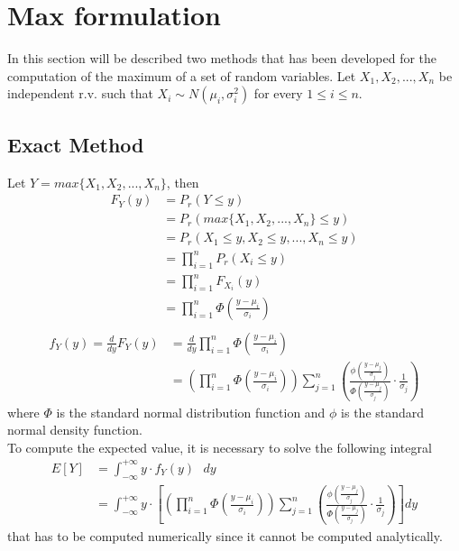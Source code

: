 \section{Max formulation}\label{max_formulation}

In this section will be described two methods that has been developed for the computation of the maximum of a set of random variables.
Let $X_1, X_2, ..., X_n$ be independent r.v. such that $X_i \sim N(\mu_i, \sigma_i^2)$ for every $1 \leq i \leq n.$

\subsection{Exact Method}
Let $Y = max\{X_1, X_2, ..., X_n\}$, then
\begin{align*}
	F_Y(y) &= P_r(Y \leq y) \\
	&= P_r(max\{X_1, X_2, ..., X_n\} \leq y) \\
	&= P_r(X_1 \leq y, X_2 \leq y, ..., X_n \leq y) \\
	&= \prod_{i = 1}^n P_r(X_i \leq y)  \tag*{(by indipendence of r.v)} \\
	&= \prod_{i = 1}^n F_{X_i}(y)  \\
	&= \prod_{i = 1}^n \Phi\left(\frac{y - \mu_i}{\sigma_i}\right) \\
\end{align*}
\begin{align*}
	f_Y(y) = \frac{d}{dy} F_Y(y) &= \frac{d}{dy} \prod_{i = 1}^n \Phi\left(\frac{y - \mu_i}{\sigma_i}\right) \\
	&= \left(\prod_{i = 1}^n \Phi\left(\frac{y - \mu_i}{\sigma_i}\right)\right) \sum_{j = 1}^n \left(\frac{\phi\left(\frac{y - \mu_j}{\sigma_j}\right)}{\Phi\left(\frac{y - \mu_j}{\sigma_j}\right)} \cdot \frac{1}{\sigma_j}\right)
\end{align*}
where $\Phi$ is the standard normal distribution function and $\phi$ is the standard normal density function. \\
To compute the expected value, it is necessary to solve the following integral
\begin{align*}
	E[Y] &= \int_{-\infty}^{+\infty} y \cdot f_Y(y)\text{ }dy \\
	&= \int_{-\infty}^{+\infty} y \cdot \left[\left(\prod_{i = 1}^n \Phi\left(\frac{y - \mu_i}{\sigma_i}\right)\right) \sum_{j = 1}^n \left(\frac{\phi\left(\frac{y - \mu_j}{\sigma_j}\right)}{\Phi\left(\frac{y - \mu_j}{\sigma_j}\right)} \cdot \frac{1}{\sigma_j}\right)\right]dy
\end{align*}
that has to be computed numerically since it cannot be computed analytically.

